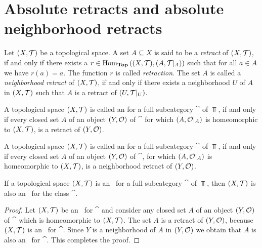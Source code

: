 \section{Absolute retracts and absolute neighborhood retracts}

\begin{definition}
	Let $\tspace$ be a topological space. A set $A \subseteq X$ is said to be a \textit{retract} of $\tspace$, if and only if there exists a $r \in \Hom_\Top\pbraces{\tspace, \reltspace}$ such that for all $a \in A$ we have $r(a) = a$. The function $r$ is called \textit{retraction}. The set $A$ is called a \textit{neighborhood retract} of $\tspace$, if and only if there exists a neighborhood $U$ of $A$ in $\tspace$ such that $A$ is a retract of $\reltspace[U][T]$. 
\end{definition}

\begin{definition}
	A topological space $\tspace$ is called an \textit{\ar} for a full subcategory $\cat$ of $\Top$, if and only if every closed set $A$ of an object $\tspace[Y][O]$ of $\cat$ for which ${\left ( A, \mathcal{O}\vert_A \right )}$ is homeomorphic to $\tspace$, is a retract of $\tspace[Y][O]$.    
\end{definition}

\begin{definition}
	A topological space $\tspace$ is called an \textit{\anr} for a full subcategory $\cat$ of $\Top$, if and only if every closed set $A$ of an object $\tspace[Y][O]$ of $\cat$, for which ${\left ( A, \mathcal{O}\vert_A \right )}$ is homeomorphic to $\tspace$, is a neighborhood retract of $\tspace[Y][O]$.    
\end{definition}

\begin{proposition}
	If a topological space $\tspace$ is an \ar\ for a full subcategory $\cat$ of $\Top$, then $\tspace$ is also an \anr\ for the class $\cat$. 
\end{proposition}
\begin{proof}
	Let $\tspace$ be an \ar\ for $\cat$ and consider any closed set $A$ of an object $\tspace[Y][O]$ of $\cat$ which is homeomorphic to $\tspace$. The set $A$ is a retract of $\tspace[Y][O]$, because $\tspace$ is an \ar\ for $\cat$. Since $Y$ is a neighborhood of $A$ in $\tspace[Y][O]$ we obtain that $A$ is also an \anr\ for $\cat$. This completes the proof. 
\end{proof}


